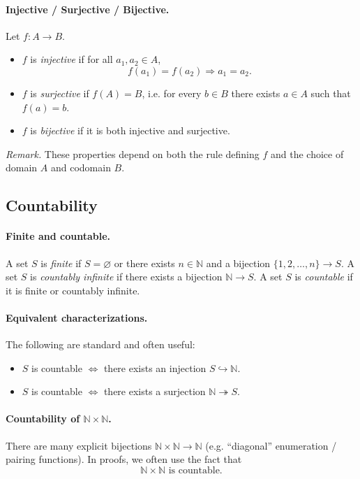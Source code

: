 \documentclass[12pt]{article}
\begin{document}
\paragraph{Injective / Surjective / Bijective.}
Let $f:A\to B$.
\begin{itemize}
  \item $f$ is \emph{injective} if for all $a_1,a_2\in A$,
  \[
  f(a_1)=f(a_2)\Rightarrow a_1=a_2.
  \]
  \item $f$ is \emph{surjective} if $f(A)=B$, i.e. for every $b\in B$ there exists $a\in A$ such that $f(a)=b$.
  \item $f$ is \emph{bijective} if it is both injective and surjective.
\end{itemize}
\emph{Remark.} These properties depend on both the rule defining $f$ and the choice of domain $A$ and codomain $B$.

\subsection*{Countability}

\paragraph{Finite and countable.}
A set $S$ is \emph{finite} if $S=\varnothing$ or there exists $n\in\mathbb{N}$ and a bijection $\{1,2,\dots,n\}\to S$.
A set $S$ is \emph{countably infinite} if there exists a bijection $\mathbb{N}\to S$.
A set $S$ is \emph{countable} if it is finite or countably infinite.

\paragraph{Equivalent characterizations.}
The following are standard and often useful:
\begin{itemize}
  \item $S$ is countable $\iff$ there exists an injection $S\hookrightarrow \mathbb{N}$.
  \item $S$ is countable $\iff$ there exists a surjection $\mathbb{N}\twoheadrightarrow S$.
\end{itemize}

\paragraph{Countability of $\mathbb{N}\times\mathbb{N}$.}
There are many explicit bijections $\mathbb{N}\times\mathbb{N}\to\mathbb{N}$ (e.g. ``diagonal'' enumeration / pairing functions). In proofs, we often use the fact that
\[
\mathbb{N}\times\mathbb{N}\text{ is countable}.
\]
\end{document}
